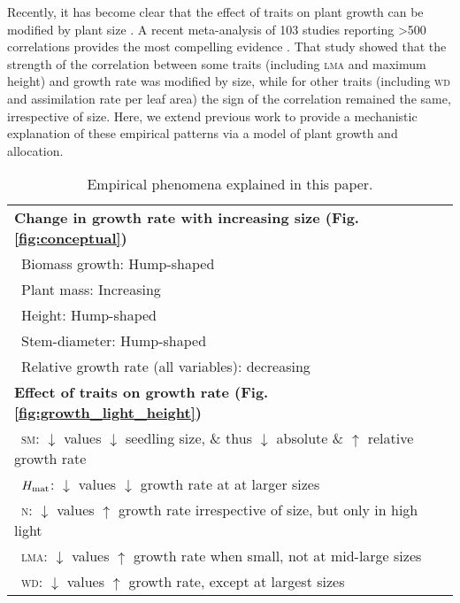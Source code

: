 \documentclass[9pt,twocolumn,twoside,lineno]{pnas-new}
\newcommand{\lma}{\textsc{lma}}
\newcommand{\wood}{\textsc{wd}}
\newcommand{\seed}{\textsc{sm}}
\newcommand{\nitrogen}{\textsc{n}}
\begin{document}
Recently, it has become clear that the effect of traits on plant growth can be modified by plant size \citep{Falster-2011, Ruger-2012, Iida-2014, Visser-2016, Gibert-2016}. A recent meta-analysis of 103 studies reporting \textgreater 500 correlations provides the most compelling evidence \citep{Gibert-2016}. That study showed that the strength of the correlation between some traits (including {\lma} and maximum height) and growth rate was modified by size, while for other traits (including {\wood} and assimilation rate per leaf area) the sign of the correlation remained the same, irrespective of size. Here, we extend previous work \citep{Gibert-2016} to provide a mechanistic explanation of these empirical patterns via a model of plant growth and allocation.

\begin{table}[!ht]
\caption{Empirical phenomena explained in this paper.}
\begin{tabular}{p{8cm}}
\toprule
\textbf{Change in growth rate with increasing size (Fig. \ref{fig:conceptual})}\\
 $\,$ Biomass growth: Hump-shaped \citep{Givnish-1988, Koch-2004} \\
 $\,$ Plant mass: Increasing \citep{Sillett-2010, Stephenson-2014} \\
 $\,$ Height: Hump-shaped \citep{Ryan-2006, Sillett-2010, King-2011} \\
 $\,$ Stem-diameter: Hump-shaped \citep{Canham-2004, Canham-2006, Herault-2011} \\
 $\,$ Relative growth rate (all variables): decreasing \citep{Rees-2010, Iida-2014}\\
\textbf{Effect of traits on growth rate (Fig. \ref{fig:growth_light_height})}\\
 $\,$ {\seed}: $\downarrow$ values $\downarrow$ seedling size, \& thus $\downarrow$ absolute \& $\uparrow$ relative growth rate \citep{Gibert-2016} \\
 $\,$ $H_{\rm mat}$: $\downarrow$ values $\downarrow$ growth rate at at larger sizes \citep{Gibert-2016}\\
 $\,$  {\nitrogen}: $\downarrow$ values $\uparrow$ growth rate irrespective of size, but only in high light \citep{Gibert-2016}\\
 $\,$ {\lma}: $\downarrow$ values $\uparrow$ growth rate when small, not at mid-large sizes \citep{Gibert-2016}\\
 $\,$ {\wood}: $\downarrow$ values $\uparrow$ growth rate, except at largest sizes \citep{Gibert-2016}\\

\end{tabular}
\end{table}
\end{document}
